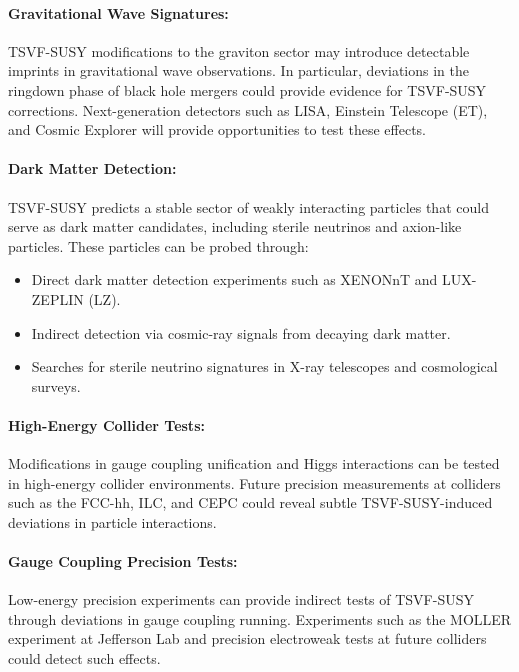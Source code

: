\documentclass[twocolumn,superscriptaddress,floatfix]{revtex4-2}
\begin{document}
\paragraph{Gravitational Wave Signatures:}  
TSVF-SUSY modifications to the graviton sector may introduce detectable imprints in gravitational wave observations. In particular, deviations in the ringdown phase of black hole mergers could provide evidence for TSVF-SUSY corrections. Next-generation detectors such as LISA, Einstein Telescope (ET), and Cosmic Explorer will provide opportunities to test these effects.

\paragraph{Dark Matter Detection:}  
TSVF-SUSY predicts a stable sector of weakly interacting particles that could serve as dark matter candidates, including sterile neutrinos and axion-like particles. These particles can be probed through:
\begin{itemize}
    \item Direct dark matter detection experiments such as XENONnT and LUX-ZEPLIN (LZ).
    \item Indirect detection via cosmic-ray signals from decaying dark matter.
    \item Searches for sterile neutrino signatures in X-ray telescopes and cosmological surveys.
\end{itemize}

\paragraph{High-Energy Collider Tests:}  
Modifications in gauge coupling unification and Higgs interactions can be tested in high-energy collider environments. Future precision measurements at colliders such as the FCC-hh, ILC, and CEPC could reveal subtle TSVF-SUSY-induced deviations in particle interactions.

\paragraph{Gauge Coupling Precision Tests:}  
Low-energy precision experiments can provide indirect tests of TSVF-SUSY through deviations in gauge coupling running. Experiments such as the MOLLER experiment at Jefferson Lab and precision electroweak tests at future colliders could detect such effects.
\end{document}
